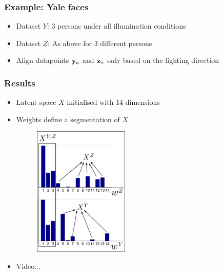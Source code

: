 \documentclass{beamer}
\begin{document}
\begin{frame}
\frametitle{Example: Yale faces}
\begin{figure}
\end{figure}
\begin{itemize}
	\item Dataset $Y$: $3$ persons under all illumination conditions
	\item Dataset $Z$: As above for $3$ different persons
	\item Align datapoints ${\bf y}_n$ and ${\bf z}_n$ only based on the lighting direction
\end{itemize}
\end{frame}



\begin{frame}
\frametitle{Results}
\begin{itemize}
  \item Latent space $X$  initialised with $14$ dimensions
  \item Weights define a segmentation of $X$
\begin{figure}
\begin{center}
{
        \includegraphics[width=0.43\textwidth]{yaleScales.png}
}
\end{center}
\end{figure}
\item Video...
\end{itemize}
\end{frame}
\end{document}
